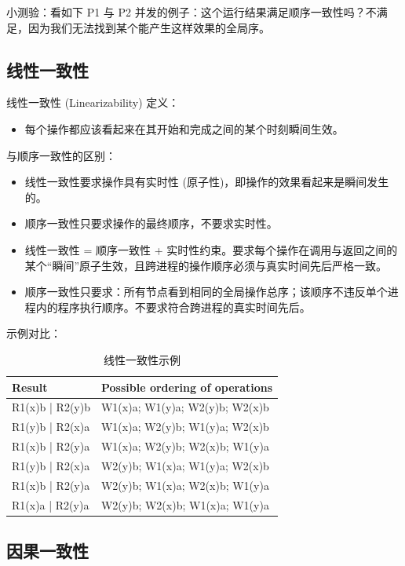 小测验：看如下 P1 与 P2 并发的例子：这个运行结果满足顺序一致性吗？不满足，因为我们无法找到某个能产生这样效果的全局序。

\subsection{线性一致性}

线性一致性 (Linearizability) 定义：
\begin{itemize}
\item 每个操作都应该看起来在其开始和完成之间的某个时刻瞬间生效。
\end{itemize}

与顺序一致性的区别：
\begin{itemize}
\item 线性一致性要求操作具有实时性 (原子性)，即操作的效果看起来是瞬间发生的。
\item 顺序一致性只要求操作的最终顺序，不要求实时性。
\item 线性一致性 = 顺序一致性 + 实时性约束。要求每个操作在调用与返回之间的某个“瞬间”原子生效，且跨进程的操作顺序必须与真实时间先后严格一致。
\item 顺序一致性只要求：所有节点看到相同的全局操作总序；该顺序不违反单个进程内的程序执行顺序。不要求符合跨进程的真实时间先后。
\end{itemize}

示例对比：

\begin{table}[htbp]
\centering
\caption{线性一致性示例}
\begin{tabular}{ll}
\toprule
Result & Possible ordering of operations \\
\midrule
R1(x)b | R2(y)b & W1(x)a; W1(y)a; W2(y)b; W2(x)b \\
R1(y)b | R2(x)a & W1(x)a; W2(y)b; W1(y)a; W2(x)b \\
R1(x)b | R2(y)a & W1(x)a; W2(y)b; W2(x)b; W1(y)a \\
R1(y)b | R2(x)a & W2(y)b; W1(x)a; W1(y)a; W2(x)b \\
R1(x)b | R2(y)a & W2(y)b; W1(x)a; W2(x)b; W1(y)a \\
R1(x)a | R2(y)a & W2(y)b; W2(x)b; W1(x)a; W1(y)a \\
\bottomrule
\end{tabular}
\end{table}

\subsection{因果一致性}

